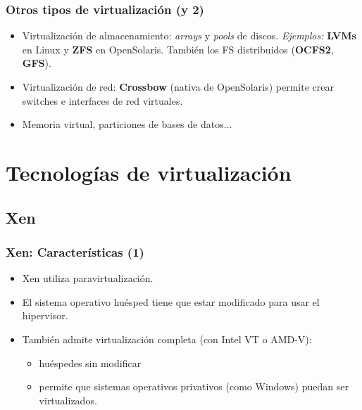 \documentclass{beamer}
\begin{document}
\begin{frame}
\frametitle{Otros tipos de virtualización (y 2)}

\begin{itemize}
\item \alert{Virtualización de almacenamiento:} \textit{arrays} y \textit{pools} de discos. \textit{Ejemplos:} \textbf{LVMs} en Linux y \textbf{ZFS} en OpenSolaris. También los FS distribuidos (\textbf{OCFS2}, \textbf{GFS}).
\item \alert{Virtualización de red:} \textbf{Crossbow} (nativa de OpenSolaris) permite crear switches e interfaces de red virtuales.
\item Memoria virtual, particiones de bases de datos...
\end{itemize}

\end{frame}


\section{Tecnologías de virtualización}


\subsection{Xen}


\begin{frame}
\frametitle{Xen: Características (1)}

\begin{itemize}
\item Xen utiliza \alert{paravirtualización}.
\item El sistema operativo huésped tiene que estar modificado para usar el hipervisor.
\item También admite virtualización completa (con Intel VT o AMD-V): 
	\begin{itemize}
	\item huéspedes sin modificar 
	\item permite que sistemas operativos privativos (como Windows) puedan ser virtualizados.
	\end{itemize}
\end{itemize}

\end{frame}

\end{document}

